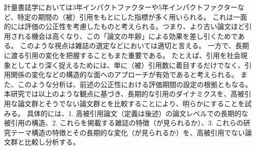計量書誌学においては3年インパクトファクターや5年インパクトファクターなど\cite{Cla1}、特定の期間の（被）引用をもとにした指標が多く用いられる。
これは一面的には評価の公正性を考慮したものと考えられる。つまり、より古い論文ほど引用される機会は高くなり、この「論文の年齢」による効果を差し引くためである。
このような視点は雑誌の選定などにおいては適切と言える。
一方で、長期に渡る引用の変化を把握することもまた重要である。
たとえば、引用を社会現象としてより深く捉えるためには、単に（被）引用数に着目するだけでなく、引用関係の変化などの構造的な面へのアプローチが有効であると考えられる。
また、このような分析は、前述の公正性における評価期間の設定の根拠ともなる。
本研究では以上のような観点に基づき、長期的な引用のダイナミクスを、高被引用な論文群とそうでない論文群とを比較することにより、明らかにすることを試みる。
具体的には、1. 高被引用論文（定義は後述）の論文レベルでの長期的な被引用の構造、2. これらを掲載する雑誌の特徴（が見られるか）、3. これらの研究テーマ構造の特徴とその長期的な変化（が見られるか）を、高被引用でない論文群と比較し分析する。
